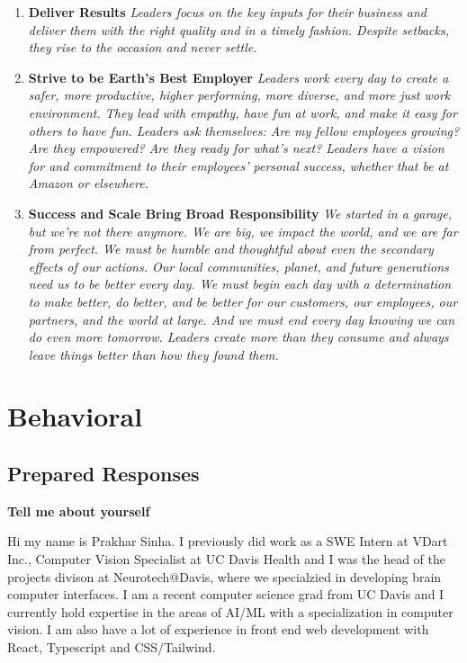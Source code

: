 \documentclass{article}
\begin{document}
\begin{enumerate}
\item \textbf{Deliver Results} \textit{Leaders focus on the key inputs for their business and deliver them with the right quality and in a timely fashion. Despite setbacks, they rise to the occasion and never settle.}

\item \textbf{Strive to be Earth’s Best Employer} \textit{Leaders work every day to create a safer, more productive, higher performing, more diverse, and more just work environment. They lead with empathy, have fun at work, and make it easy for others to have fun. Leaders ask themselves: Are my fellow employees growing? Are they empowered? Are they ready for what’s next? Leaders have a vision for and commitment to their employees’ personal success, whether that be at Amazon or elsewhere.}

\item \textbf{Success and Scale Bring Broad Responsibility} \textit{We started in a garage, but we’re not there anymore. We are big, we impact the world, and we are far from perfect. We must be humble and thoughtful about even the secondary effects of our actions. Our local communities, planet, and future generations need us to be better every day. We must begin each day with a determination to make better, do better, and be better for our customers, our employees, our partners, and the world at large. And we must end every day knowing we can do even more tomorrow. Leaders create more than they consume and always leave things better than how they found them.}

\end{enumerate}

\section{Behavioral}

\subsection{Prepared Responses}

\textbf{Tell me about yourself}

Hi my name is Prakhar Sinha. I previously did work as a SWE Intern at VDart Inc., Computer Vision Specialist at UC Davis Health and I was the head of the projects divison at Neurotech@Davis, where we specialzied in developing brain computer interfaces. I am a recent computer science grad from UC Davis and I currently hold expertise in the areas of AI/ML with a specialization in computer vision. I am also have a lot of experience in front end web development with React, Typescript and CSS/Tailwind. \newline
\end{document}
